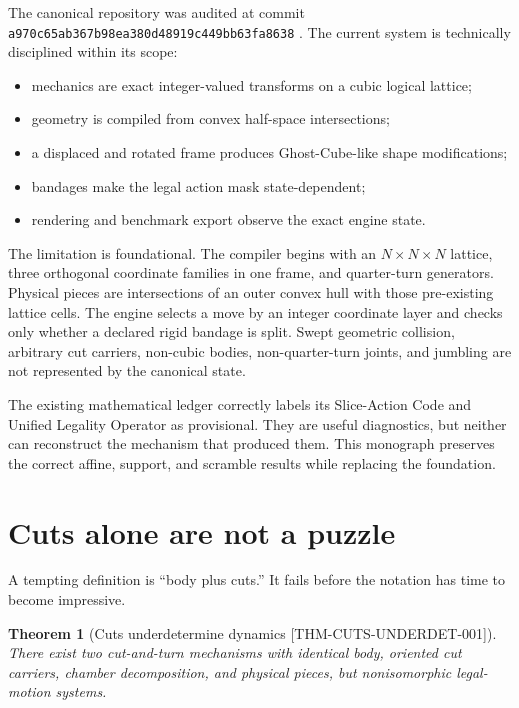 \documentclass[11pt,openany]{book}
\newcommand{\claimid}[1]{\textnormal{\sffamily\footnotesize[#1]}}
\theoremstyle{polyplain}
\newtheorem{theorem}{Theorem}[chapter]
\theoremstyle{polydef}
\begin{document}
The canonical repository was audited at commit
\texttt{a970c65ab367b98ea380d48919c449bb63fa8638} \parencite{PolyTwistRepository2026}. The current system is technically disciplined within its scope:
\begin{itemize}
  \item mechanics are exact integer-valued transforms on a cubic logical lattice;
  \item geometry is compiled from convex half-space intersections;
  \item a displaced and rotated frame produces Ghost-Cube-like shape modifications;
  \item bandages make the legal action mask state-dependent;
  \item rendering and benchmark export observe the exact engine state.
\end{itemize}

The limitation is foundational. The compiler begins with an $N\times N\times N$ lattice, three orthogonal coordinate families in one frame, and quarter-turn generators. Physical pieces are intersections of an outer convex hull with those pre-existing lattice cells. The engine selects a move by an integer coordinate layer and checks only whether a declared rigid bandage is split. Swept geometric collision, arbitrary cut carriers, non-cubic bodies, non-quarter-turn joints, and jumbling are not represented by the canonical state.

The existing mathematical ledger correctly labels its Slice-Action Code and Unified Legality Operator as provisional. They are useful diagnostics, but neither can reconstruct the mechanism that produced them. This monograph preserves the correct affine, support, and scramble results while replacing the foundation.

\section{Cuts alone are not a puzzle}

A tempting definition is ``body plus cuts.'' It fails before the notation has time to become impressive.

\begin{theorem}[Cuts underdetermine dynamics \claimid{THM-CUTS-UNDERDET-001}]
\label{thm:cuts-underdetermine-dynamics}
There exist two cut-and-turn mechanisms with identical body, oriented cut carriers, chamber decomposition, and physical pieces, but nonisomorphic legal-motion systems.
\end{theorem}
\end{document}
